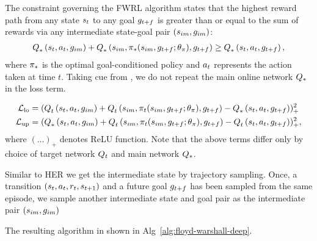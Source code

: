 The constraint governing the FWRL algorithm states that the highest reward path
from any state $\state_t$ to any goal $\goal_{t+f}$ is greater than or equal to
the sum of rewards via any intermediate state-goal pair $(\state_{im}, \goal_{im})$:
%
\begin{align}
      \fwargs{\state_{t}}{\act_t}{\goal_{im}}{*}{}
      + \fwargs{\state_{im}}{\policy_*(\state_{im}, \goal_{t+f};\param_\policy)}{\goal_{t+f}}{*}{}
      \ge \fwargs{\state_{t}}{\act_t}{\goal_{t+f}}{*}{},
\end{align}%
% 
where $\policy_*$ is the optimal goal-conditioned policy and $\act_t$ represents
the action taken at time $t$. Taking cue from \citet{MnKaSiNATURE2015}, we do
not repeat the main online network $\Q_*$ in the loss term.


%
\begin{align}
  \LossLo &= (
      \fwargs{\state_{t}}{\act_t}{\goal_{im}}{t}{}
      + \fwargs{\state_{im}}{\policy_t(\state_{im}, \goal_{t+f};\param_\policy)}{\goal_{t+f}}{t}{}
      - \fwargs{\state_{t}}{\act_t}{\goal_{t+f}}{*}{}
      )_+^2
                         \\
  \LossUp &= (
      \fwargs{\state_{t}}{\act_t}{\goal_{im}}{*}{}
      + \fwargs{\state_{im}}{\policy_t(\state_{im}, \goal_{t+f};\param_\policy)}{\goal_{t+f}}{t}{}
      - \fwargs{\state_{t}}{\act_t}{\goal_{t+f}}{t}{}
      )_+^2,
\end{align}%
% 
where $(\dots)_+$ denotes ReLU function.
Note that the above terms differ only by choice of target network $\fw_t$ and
main network $\fw_*$. 

Similar to HER we get the intermediate state by trajectory sampling. Once,
a transition $(\state_t, \act_t, \rew_t, \state_{t+1})$ and a future goal
$\goal_{t+f}$ has been sampled from the same episode, we sample another
intermediate state and goal pair as the intermediate pair $(\state_{im},
\goal_{im})$ 
% 

The resulting algorithm in shown in Alg~\ref{alg:floyd-warshall-deep}.



